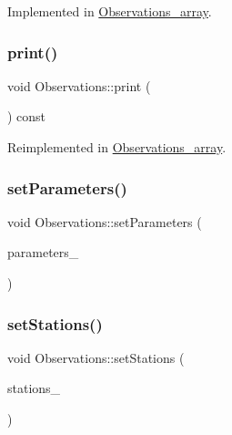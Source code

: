 Implemented in \mbox{\hyperlink{class_observations__array_ac024322acc4826e7fa60fddc74e4b3a3}{Observations\+\_\+array}}.

\mbox{\label{class_observations_a523647c5ae644959f0ed583cd7b11aba}} 
\subsubsection{\texorpdfstring{print()}{print()}}
{\footnotesize\ttfamily void Observations\+::print (\begin{DoxyParamCaption}\item[{std\+::ostream \&}]{ }\end{DoxyParamCaption}) const\hspace{0.3cm}{\ttfamily [virtual]}}



Reimplemented in \mbox{\hyperlink{class_observations__array_a2563545e5a38ec7e3ec09380c0b38855}{Observations\+\_\+array}}.

\mbox{\label{class_observations_a6965bc35582ce23ed840e9e6bf1fa228}} 
\subsubsection{\texorpdfstring{set\+Parameters()}{setParameters()}}
{\footnotesize\ttfamily void Observations\+::set\+Parameters (\begin{DoxyParamCaption}\item[{\mbox{\hyperlink{classanen_par_1_1_parameters}{anen\+Par\+::\+Parameters}}}]{parameters\+\_\+ }\end{DoxyParamCaption})}

\mbox{\label{class_observations_a01ddf7eb5d0b9c3fec31731a931cfdf4}} 
\subsubsection{\texorpdfstring{set\+Stations()}{setStations()}}
{\footnotesize\ttfamily void Observations\+::set\+Stations (\begin{DoxyParamCaption}\item[{\mbox{\hyperlink{classanen_sta_1_1_stations}{anen\+Sta\+::\+Stations}}}]{stations\+\_\+ }\end{DoxyParamCaption})}

